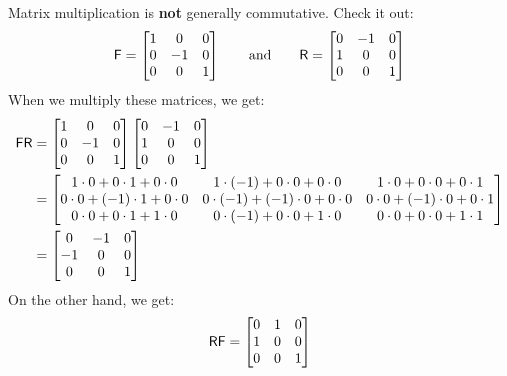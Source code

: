 \begin{warning}
Matrix multiplication is \textbf{not} generally commutative. Check it out:
\[
\mathsf{F} =
\begin{bmatrix}
1 & 0 & 0\\
0 & -1 & 0\\
0 & 0 & 1
\end{bmatrix}
\qquad\text{and}\qquad
\mathsf{R} = 
\begin{bmatrix}
0 & -1 & 0\\
1 & 0 & 0\\
0 & 0 & 1
\end{bmatrix}
\]
When we multiply these matrices, we get:
\begin{align*}
\mathsf{F}\mathsf{R} &= \begin{bmatrix}
1 & 0 & 0\\
0 & -1 & 0\\
0 & 0 & 1\\
\end{bmatrix}
\begin{bmatrix}
0 & -1 & 0\\
1 & 0 & 0\\
0 & 0 & 1\\
\end{bmatrix} \\
&=
\begin{bmatrix}
1\cdot 0 +  0\cdot 1 + 0\cdot 0 & 1\cdot (-1) +  0\cdot 0 + 0\cdot 0 & 1\cdot 0 +  0\cdot 0 + 0\cdot 1\\
0\cdot 0 + (-1)\cdot 1 + 0\cdot 0 & 0\cdot (-1) + (-1)\cdot 0 + 0\cdot 0 & 0\cdot 0 + (-1)\cdot 0 + 0\cdot 1\\
0\cdot 0 +  0\cdot 1 + 1\cdot 0 & 0\cdot (-1) +  0\cdot 0 + 1\cdot 0 & 0\cdot 0 +  0\cdot 0 + 1\cdot 1\\
\end{bmatrix} \\
&=
\begin{bmatrix}
0 & -1 & 0\\
-1 & 0 & 0\\
0 & 0 & 1\\
\end{bmatrix}
\end{align*}
On the other hand, we get:
\[
\mathsf{R}\mathsf{F} = \begin{bmatrix}
0 & 1 & 0\\
1 & 0 & 0\\
0 & 0 & 1
\end{bmatrix}
\]
\end{warning}

